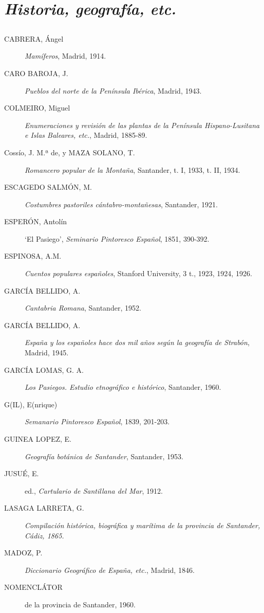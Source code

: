 \documentclass[11pt,spanish,b5paper]{book}
\begin{document}
\section{\emph{Historia, geografía, etc.}}

\subsection{} \begin{description} 
\item[CABRERA, Ángel] \textit{Mamíferos}, Madrid, 1914.
\item[CARO BAROJA, J.] \textit{Pueblos del norte de la Península Ibérica}, Madrid, 1943.
\item[COLMEIRO, Miguel] \textit{Enumeraciones y revisión de las plantas de la Península Hispano-Lusitana e Islas Baleares, etc.}, Madrid, 1885-89.
\item[Cossío, J. M.ª de, y MAZA SOLANO, T.] \textit{Romancero popular de la Montaña}, Santander, t. I, 1933, t. II, 1934. 
\item[ESCAGEDO SALMÓN, M.] \textit{Costumbres pastoriles cántabro-montañesas}, Santander, 1921.
\item[ESPERÓN, Antolín] `El Pasiego', \textit{Seminario Pintoresco Español}, 1851, 390-392.
\item[ESPINOSA, A.M.] \textit{Cuentos populares españoles}, Stanford University, 3 t., 1923, 1924, 1926. 
\item[GARCÍA BELLIDO, A.] \textit{Cantabria Romana}, Santander, 1952. 
\item[GARCÍA BELLIDO, A.] \textit{España y los españoles hace dos mil años según la geografía de Strabón}, Madrid, 1945.
\item[GARCÍA LOMAS, G. A.] \textit{Los Pasiegos. Estudio etnográfico e histórico}, Santander, 1960.
\item[G(IL), E(nrique)] \textit{Semanario Pintoresco Español}, 1839, 201-203. 
\item[GUINEA LOPEZ, E.] \textit{Geografía botánica de Santander}, Santander, 1953. 
\item[JUSUÉ, E.] ed., \textit{Cartulario de Santillana del Mar}, 1912. 
\item[LASAGA LARRETA, G.] \textit{Compilación histórica, biográfica y marítima de la provincia de Santander, Cádiz, 1865.}
\item[MADOZ, P.] \textit{Diccionario Geográfico de España, etc.}, Madrid, 1846.
\item[NOMENCLÁTOR] de la provincia de Santander, 1960.

\end{description}
\end{document}
